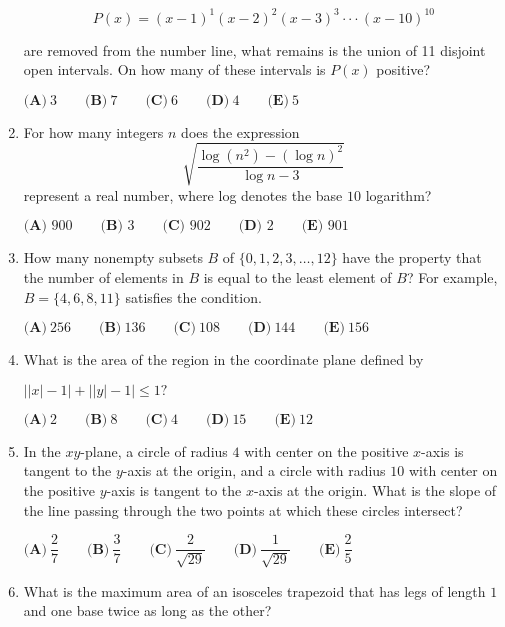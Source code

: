\documentclass{article}
\begin{document}
\begin{enumerate}[label=\arabic*., itemsep=0.5em]
\begin{equation*}
P(x)  = (x-1)^1 (x-2)^2 (x-3)^3 \cdot \cdot \cdot (x-10)^{10}
\end{equation*}


are removed from the number line, what remains is the union of 11 disjoint open intervals. On how many of these intervals is $P(x)$ positive?

$\textbf{(A)}~3\qquad\textbf{(B)}~7\qquad\textbf{(C)}~6\qquad\textbf{(D)}~4\qquad\textbf{(E)}~5$\par \vspace{0.5em}\item For how many integers $n$ does the expression
\begin{equation*}
\sqrt{\frac{\log (n^2) - (\log n)^2}{\log n - 3}}
\end{equation*}
represent a real number, where log denotes the base $10$ logarithm?

$\textbf{(A) }900 \qquad \textbf{(B) }3\qquad \textbf{(C) }902 \qquad \textbf{(D) } 2  \qquad \textbf{(E) }901$\par \vspace{0.5em}\item How many nonempty subsets $B$ of $\{0, 1, 2, 3, \dots, 12\}$ have the property that the number of elements in $B$ is equal to the least element of $B$? For example, $B = \{4, 6, 8, 11\}$ satisfies the condition.

$\textbf{(A)}\ 256 \qquad\textbf{(B)}\ 136 \qquad\textbf{(C)}\ 108 \qquad\textbf{(D)}\ 144 \qquad\textbf{(E)}\ 156$\par \vspace{0.5em}\item What is the area of the region in the coordinate plane defined by

$\left||x|-1\right|+\left||y|-1\right|\leq 1?$

$\textbf{(A)}~2\qquad\textbf{(B)}~8\qquad\textbf{(C)}~4\qquad\textbf{(D)}~15\qquad\textbf{(E)}~12$\par \vspace{0.5em}\item In the $xy$-plane, a circle of radius $4$ with center on the positive $x$-axis is tangent to the $y$-axis at the origin, and a circle with radius $10$ with center on the positive $y$-axis is tangent to the $x$-axis at the origin. What is the slope of the line passing through the two points at which these circles intersect?

$\textbf{(A)}\ \dfrac{2}{7} \qquad\textbf{(B)}\ \dfrac{3}{7}  \qquad\textbf{(C)}\ \dfrac{2}{\sqrt{29}}  \qquad\textbf{(D)}\ \dfrac{1}{\sqrt{29}}  \qquad\textbf{(E)}\ \dfrac{2}{5}$\par \vspace{0.5em}\item What is the maximum area of an isosceles trapezoid that has legs of length $1$ and one base twice as long as the other?


\end{enumerate}
\end{document}
